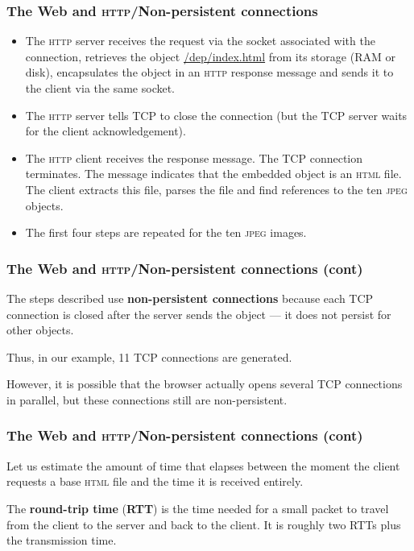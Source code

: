 %
\begin{frame}
\frametitle{The Web and \textsc{http}/Non-persistent connections} 

\begin{itemize}

  \item The \textsc{http} server receives the request via the socket
    associated with the connection, retrieves the object
    \url{/dep/index.html} from its storage (RAM or disk), encapsulates
    the object in an \textsc{http} response message and sends it to
    the client via the same socket.

  \item The \textsc{http} server tells TCP to close the connection
    (but the TCP server waits for the client acknowledgement).

  \item The \textsc{http} client receives the response message. The
    TCP connection terminates. The message indicates that the
    embedded object is an \textsc{html} file. The client extracts this
    file, parses the file and find references to the ten \textsc{jpeg}
    objects.

 \item The first four steps are repeated for the ten \textsc{jpeg}
   images.

\end{itemize}

\end{frame}

%
\begin{frame}
\frametitle{The Web and \textsc{http}/Non-persistent connections (cont)} 

The steps described use \textbf{non-persistent connections} because
each TCP connection is closed after the server sends the object --- it
does not persist for other objects.

\bigskip

Thus, in our example, 11 TCP connections are generated.

\bigskip

However, it is possible that the browser actually opens several TCP
connections in parallel, but these connections still are
non-persistent.

\end{frame}

%
\begin{frame}
\frametitle{The Web and \textsc{http}/Non-persistent connections (cont)} 

Let us estimate the amount of time that elapses between the moment the
client requests a base \textsc{html} file and the time it is received
entirely.

\bigskip

The \textbf{round-trip time} (\textbf{RTT}) is the time needed for a
small packet to travel from the client to the server and back to the
client. It is roughly two RTTs plus the transmission time.

\end{frame}

